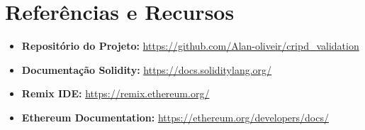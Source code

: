 \documentclass[12pt,a4paper]{article}
\begin{document}
\section{Referências e Recursos}

\begin{itemize}
    \item \textbf{Repositório do Projeto:} \url{https://github.com/Alan-oliveir/cripd_validation}
    \item \textbf{Documentação Solidity:} \url{https://docs.soliditylang.org/}
    \item \textbf{Remix IDE:} \url{https://remix.ethereum.org/}
    \item \textbf{Ethereum Documentation:} \url{https://ethereum.org/developers/docs/}
\end{itemize}
\end{document}
